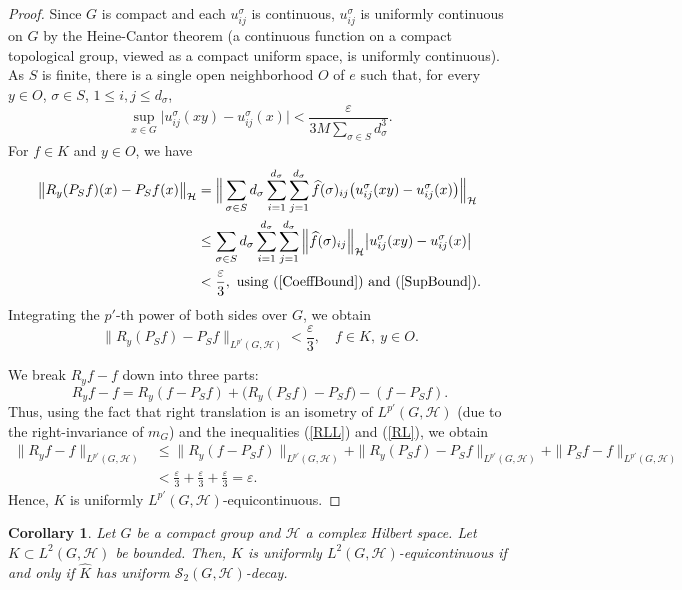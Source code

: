 \documentclass[11pt]{amsart}
\newtheorem{corollary}[theorem]{Corollary}
\begin{document}
\begin{proof}
Since $G$ is compact and each $u^\sigma_{ij}$ is continuous, $u^\sigma_{ij}$ is
uniformly continuous on $G$ by the Heine-Cantor theorem (a continuous function on a compact topological group, viewed as a compact uniform space, is uniformly continuous). As $S$
is finite, there is a single open neighborhood $O$ of $e$ such that, for every
$y\in O$, $\sigma\in S$, $1\le i,j\le d_\sigma$,
\begin{equation}\label{SupBound}
\sup_{x\in G}\big|u^\sigma_{ij}(xy)-u^\sigma_{ij}(x)\big|<
\frac{\varepsilon}{3M\sum\limits_{\sigma\in S}d_\sigma^3}.
\end{equation}
For $f\in K$ and $y\in O$, we have
\begin{align*}
\big\|R_y(P_Sf)(x)-P_Sf(x)\big\|_\mathcal{H}&=\Big\|\sum_{\sigma\in S}d_\sigma\sum_{i=1}^{d_\sigma}\sum_{j=1}^{d_\sigma}
\widehat f(\sigma)_{ij}\big(u^\sigma_{ij}(xy)-u^\sigma_{ij}(x)\big)\Big\|_\mathcal{H}\\
&\le \sum_{\sigma\in S}d_\sigma\sum_{i=1}^{d_\sigma}\sum_{j=1}^{d_\sigma}\Big\|\widehat f(\sigma)_{ij}\Big\|_\mathcal{H}\big |u^\sigma_{ij}(xy)-u^\sigma_{ij}(x)\big|\\
&<\frac{\varepsilon}{3}, \text{ using (\ref{CoeffBound}) and (\ref{SupBound}).}
\end{align*}
 Integrating  the $p'$-th power of both sides over $G$, we obtain
\begin{equation}\label{RL}
\|R_y(P_Sf)-P_Sf\|_{L^{p'}(G,\mathcal{H})}<\frac{\varepsilon}{3},\quad f\in K,\ y\in O. 
\end{equation}

  We break $R_yf-f$ down into three parts:
$$
R_yf-f=R_y(f-P_Sf)+\big(R_y(P_Sf)-P_Sf\big)-(f-P_Sf).
$$
Thus,  using the fact that right translation is an isometry of $L^{p'}(G,\mathcal{H})$
 (due to the right-invariance of $m_G$) and  the inequalities  (\ref{RLL}) and   (\ref{RL}), we obtain
\begin{align*}
\|R_yf-f\|_{L^{p'}(G,\mathcal{H})}&\le\|R_y(f-P_Sf)\|_{L^{p'}(G,\mathcal{H})}
+\|R_y(P_Sf)-P_Sf\|_{L^{p'}(G,\mathcal{H})}+\|P_Sf-f\|_{L^{p'}(G,\mathcal{H})}\\
&<\frac{\varepsilon}{3}+\frac{\varepsilon}{3}+\frac{\varepsilon}{3}=\varepsilon.
\end{align*}
Hence, $K$ is uniformly
$L^{p'}(G,\mathcal{H})$-equicontinuous.
\end{proof}


\begin{corollary}\label{cor:equiv}
Let $G$ be a compact group and $\mathcal{H}$ a complex Hilbert space. Let $K\subset L^2(G,\mathcal{H})$ be bounded. Then,  $K$ is uniformly $L^2(G,\mathcal{H})$-equicontinuous if and only if
$\widehat K$ has uniform $\mathscr{S}_2(G,\mathcal{H})$-decay.
\end{corollary}
\end{document}
